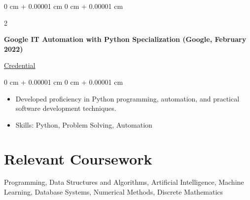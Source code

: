 \documentclass[10pt, letterpaper]{article}
\newenvironment{highlights}{
    \begin{itemize}[
        topsep=0.10 cm,
        parsep=0.10 cm,
        partopsep=0pt,
        itemsep=0pt,
        leftmargin=0 cm + 10pt
    ]
}{
    \end{itemize}
} %
\newenvironment{onecolentry}{
    \begin{adjustwidth}{
        0 cm + 0.00001 cm
    }{
        0 cm + 0.00001 cm
    }
}{
    \end{adjustwidth}
} %
\newenvironment{twocolentry}[2][]{
    \onecolentry
    \def\secondColumn{#2}
    \setcolumnwidth{\fill, 4.5 cm}
    \begin{paracol}{2}
}{
    \switchcolumn \raggedleft \secondColumn
    \end{paracol}
    \endonecolentry
} %
\begin{document}
        \begin{twocolentry}
            {\href{https://www.coursera.org/account/accomplishments/specialization/W6VVV4LRX95X}{Credential}}
            \textbf{Google IT Automation with Python Specialization (Google, February 2022)}
        \end{twocolentry}
        \vspace{0.10 cm}
        
        \begin{onecolentry}
            \begin{highlights}
                \item Developed proficiency in Python programming, automation, and practical software development techniques.
                \item Skills: Python, Problem Solving, Automation
            \end{highlights}
        \end{onecolentry}
        
        \vspace{0.2 cm}


        
        

\section{Relevant Coursework}
Programming, Data Structures and Algorithms, Artificial Intelligence, Machine Learning, Database Systems, Numerical Methods, Discrete Mathematics
\end{document}
